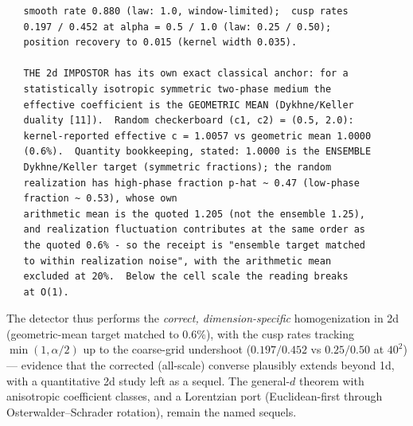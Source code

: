 \documentclass[11pt]{article}
\begin{document}
\begin{small}\begin{verbatim}
   smooth rate 0.880 (law: 1.0, window-limited);  cusp rates
   0.197 / 0.452 at alpha = 0.5 / 1.0 (law: 0.25 / 0.50);
   position recovery to 0.015 (kernel width 0.035).

   THE 2d IMPOSTOR has its own exact classical anchor: for a
   statistically isotropic symmetric two-phase medium the
   effective coefficient is the GEOMETRIC MEAN (Dykhne/Keller
   duality [11]).  Random checkerboard (c1, c2) = (0.5, 2.0):
   kernel-reported effective c = 1.0057 vs geometric mean 1.0000
   (0.6%).  Quantity bookkeeping, stated: 1.0000 is the ENSEMBLE
   Dykhne/Keller target (symmetric fractions); the random
   realization has high-phase fraction p-hat ~ 0.47 (low-phase
   fraction ~ 0.53), whose own
   arithmetic mean is the quoted 1.205 (not the ensemble 1.25),
   and realization fluctuation contributes at the same order as
   the quoted 0.6% - so the receipt is "ensemble target matched
   to within realization noise", with the arithmetic mean
   excluded at 20%.  Below the cell scale the reading breaks
   at O(1).
\end{verbatim}\end{small}
The detector thus performs the \emph{correct, dimension-specific} homogenization in 2d (geometric-mean target matched to $0.6\%$), with the cusp rates tracking $\min(1,\alpha/2)$ up to the coarse-grid undershoot ($0.197/0.452$ vs $0.25/0.50$ at $40^2$) — evidence that the corrected (all-scale) converse plausibly extends beyond 1d, with a quantitative 2d study left as a sequel. The general-$d$ theorem with anisotropic coefficient classes, and a Lorentzian port (Euclidean-first through Osterwalder–Schrader rotation), remain the named sequels.
\end{document}
